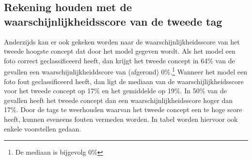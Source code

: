 
\subsection{Rekening houden met de waarschijnlijkheidsscore van de tweede tag}
Anderzijds kan er ook gekeken worden naar de waarschijnlijkheidsscore van het tweede hoogste concept dat door het model gegeven wordt. Als het model een foto correct geclassificeerd heeft, dan krijgt het tweede concept in 64\% van de gevallen een waarschijnlijkheiddscore van (afgerond) 0\%.\footnote{De mediaan is bijgevolg 0\%} Wanneer het model een foto fout geclassificeerd heeft, dan ligt de mediaan van de waarschijlijkheidsscore voor het tweede concept op 17\% en het gemiddelde op 19\%. In 50\% van de gevallen heeft het tweede concept dan een waarschijnlijkheidsscore hoger dan 17\%. Door de tags te weerhouden waarvan het tweede concept een te hoge score heeft, kunnen eveneens fouten vermeden worden. In tabel worden hiervoor ook enkele voorstellen gedaan.


